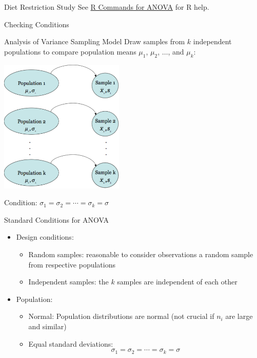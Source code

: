 \documentclass[t,xcolor=pdftex,dvipsnames,table,handout]{beamer}
\newcommand{\bi}{\begin{itemize}}
\newcommand{\ei}{\end{itemize}}
\begin{document}
\begin{frame}{Diet Restriction Study}
See \href{https://heroic-horse-92e142.netlify.app/r_commands_for_anova}{R Commands for ANOVA} for R help.

\end{frame}
\begin{frame}
  \vskip25mm
  \centering \begin{block}
  {\Huge Checking Conditions}
\end{block}
\end{frame}

  
\begin{frame}{Analysis of Variance Sampling Model}
Draw samples from $k$ \alert{independent} populations to compare
population means $\mu_1$, $\mu_2$, $\ldots$, and $\mu_k$:
    \vspace{-1ex}
\begin{center}
\includegraphics[height=2.5in]{sampling_model.pdf}
\end{center}
 \vspace{-1ex} Condition: $\sigma_1=\sigma_2=\cdots=\sigma_k=\sigma$
\end{frame}
\begin{frame}{Standard Conditions for ANOVA}
\bi
    \item \alert{Design conditions:}
    \bi
        \item \alert{Random samples:} reasonable to consider observations
        a random sample from respective populations \pause
        \item \alert{Independent samples:} the $k$ samples are
        independent of each other
    \ei
    \pause
    \item \alert{Population:}
    \bi
        \item \alert{Normal:} Population distributions are normal
        \pause
        (not crucial if $n_i$ are large and similar)
        \pause
        \item \alert{Equal standard deviations:}
        $$
            \sigma_1=\sigma_2=\cdots=\sigma_k=\sigma
        $$
    \ei
\ei
\end{frame}
\end{document}
